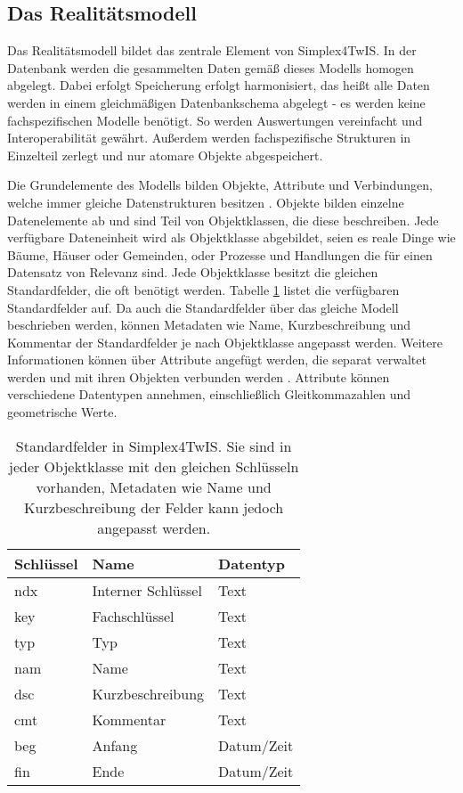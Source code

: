 \subsection{Das Realitätsmodell}
\label{sec:simplex-reality}

Das Realitätsmodell bildet das zentrale Element von Simplex4TwIS. In der Datenbank werden die gesammelten Daten gemäß dieses Modells homogen abgelegt. Dabei erfolgt Speicherung erfolgt harmonisiert, das heißt alle Daten werden in einem gleichmäßigen Datenbankschema abgelegt - es werden keine fachspezifischen Modelle benötigt. So werden Auswertungen vereinfacht und Interoperabilität gewährt. Außerdem werden fachspezifische Strukturen in Einzelteil zerlegt und nur atomare Objekte abgespeichert.

Die Grundelemente des Modells bilden Objekte, Attribute und Verbindungen, welche immer gleiche Datenstrukturen besitzen \parencite{grossmannFachsystemeSchemaevolution2024}. Objekte bilden einzelne Datenelemente ab und sind Teil von Objektklassen, die diese beschreiben. Jede verfügbare Dateneinheit wird als Objektklasse abgebildet, seien es reale Dinge wie Bäume, Häuser oder Gemeinden, oder Prozesse und Handlungen die für einen Datensatz von Relevanz sind. Jede Objektklasse besitzt die gleichen Standardfelder, die oft benötigt werden. Tabelle \ref{tab:s4d-fields} listet die verfügbaren Standardfelder auf. Da auch die Standardfelder über das gleiche Modell beschrieben werden, können Metadaten wie Name, Kurzbeschreibung und Kommentar der Standardfelder je nach Objektklasse angepasst werden. Weitere Informationen können über Attribute angefügt werden, die separat verwaltet werden und mit ihren Objekten verbunden werden \parencite{grossmannFachsystemeSchemaevolution2024}. Attribute können verschiedene Datentypen annehmen, einschließlich Gleitkommazahlen und geometrische Werte.

\begin{table}[!ht]
  \centering
  \begin{tabular}{|| l | l | l ||}
    \hline
    Schlüssel & Name               & Datentyp   \\[0.5ex]
    \hline\hline
    ndx       & Interner Schlüssel & Text       \\
    key       & Fachschlüssel      & Text       \\
    typ       & Typ                & Text       \\
    nam       & Name               & Text       \\
    dsc       & Kurzbeschreibung   & Text       \\
    cmt       & Kommentar          & Text       \\
    beg       & Anfang             & Datum/Zeit \\
    fin       & Ende               & Datum/Zeit \\
    \hline
  \end{tabular}
  \caption[Standardfelder in Simplex4TwIS]{Standardfelder in Simplex4TwIS. Sie sind in jeder Objektklasse mit den gleichen Schlüsseln vorhanden, Metadaten wie Name und Kurzbeschreibung der Felder kann jedoch angepasst werden. \parencite{simplex4datagmbhSimplex4TwIS}}
  \label{tab:s4d-fields}
\end{table}

